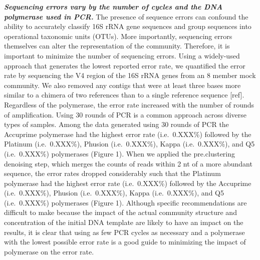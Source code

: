 \documentclass[11,]{article}
\begin{document}
\textbf{\emph{Sequencing errors vary by the number of cycles and the DNA
polymerase used in PCR.}} The presence of sequence errors can confound
the ability to accurately classify 16S rRNA gene sequences and group
sequences into operational taxonomic units (OTUs). More importantly,
sequencing errors themselves can alter the representation of the
community. Therefore, it is important to minimize the number of
sequencing errors. Using a widely-used approach that generates the
lowest reported error rate, we quantified the error rate by sequencing
the V4 region of the 16S rRNA genes from an 8 member mock community. We
also removed any contigs that were at least three bases more similar to
a chimera of two references than to a single reference sequence
{[}ref{]}. Regardless of the polymerase, the error rate increased with
the number of rounds of amplification. Using 30 rounds of PCR is a
common approach across diverse types of samples. Among the data
generated using 30 rounds of PCR the Accuprime polymerase had the
highest error rate (i.e.~0.XXX\%) followed by the Platinum
(i.e.~0.XXX\%), Phusion (i.e.~0.XXX\%), Kappa (i.e.~0.XXX\%), and Q5
(i.e.~0.XXX\%) polymerases (Figure 1). When we applied the
pre.clustering denoising step, which merges the counts of reads within 2
nt of a more abundant sequence, the error rates dropped considerably
such that the Platinum polymerase had the highest error rate
(i.e.~0.XXX\%) followed by the Accuprime (i.e.~0.XXX\%), Phusion
(i.e.~0.XXX\%), Kappa (i.e.~0.XXX\%), and Q5 (i.e.~0.XXX\%) polymerases
(Figure 1). Although specific recommendations are difficult to make
because the impact of the actual community structure and concentration
of the initial DNA template are likely to have an impact on the results,
it is clear that using as few PCR cycles as necessary and a polymerase
with the lowest possible error rate is a good guide to minimizing the
impact of polymerase on the error rate.
\end{document}
